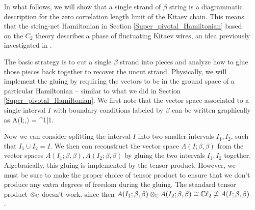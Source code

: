 In what follows, 
we will show that a single strand of $\beta$ string is a diagrammatic description for the zero correlation length limit of the Kitaev chain. 
This means that the string-net Hamiltonian in Section \ref{Super_pivotal_Hamiltonian} 
based on the $C_2$ theory describes a phase of fluctuating Kitaev wires, 
an idea previously investigated in \cite{tarantino2016,ware2016,kapustin2017}.

The basic strategy is to cut a single $\beta$ strand into pieces and analyze how to glue those pieces back together to recover the uncut strand.
Physically, we will implement the gluing by requiring the vectors to be in the ground space of a particular Hamiltonian -- similar to what we did in Section \ref{Super_pivotal_Hamiltonian}. 
We first note that the vector space associated to a single interval $I$ with boundary conditions labeled by $\beta$ can be written graphically as 
\be\label{VIbetabeta}
 A(I;\beta,\beta) = \cc \left[ \halfchain\;, \; \halfchaindot \right] \cong \cc^{1|1}.\ee
 
 Now we can consider splitting the interval $I$ into two smaller intervals $I_1,I_2$, such that $I_1\cup I_2 = I$.
 We then can reconstruct the vector space $A(I;\beta,\beta)$ from the vector 
 spaces $A(I_1;\beta,\beta),A(I_2;\beta,\beta)$ by gluing the two intervals $I_1,I_2$ together. 
Algebraically, this gluing is implemented by the tensor product. However, 
we must be sure to make the proper choice 
of tensor product to ensure that we don't produce any extra degrees of freedom during the gluing. 
The standard tensor product $\otimes_{\mathbb{C}}$ doesn't work, since then $A(I_1;\beta,\beta) \otimes_{\mathbb{C}} A(I_2;\beta,\beta) \cong \mathbb{C}\ell_2 \not\cong A(I;\beta,\beta)$. 


